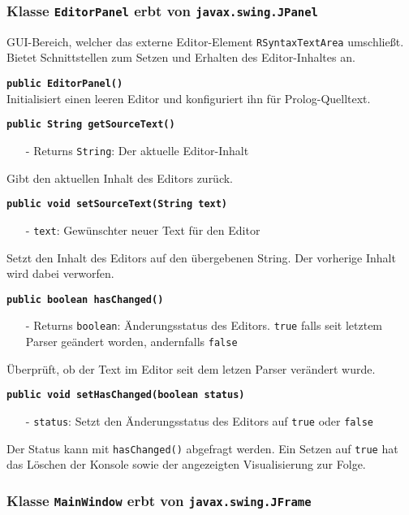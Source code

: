 \documentclass[parskip=full,11pt,twoside]{scrartcl}
\begin{document}
\subsubsection{Klasse \texttt{EditorPanel} erbt von \texttt{javax.swing.JPanel}}

GUI-Bereich, welcher das externe Editor-Element \texttt{RSyntaxTextArea} umschließt. Bietet Schnittstellen zum Setzen und Erhalten des Editor-Inhaltes an.

\textbf{\texttt{public EditorPanel()}}\\
Initialisiert einen leeren Editor und konfiguriert ihn für Prolog-Quelltext.

\textbf{\texttt{public String getSourceText()}}
\begin{itemize}[noitemsep]
	\item[-] Returns \texttt{String}: Der aktuelle Editor-Inhalt
\end{itemize}
Gibt den aktuellen Inhalt des Editors zurück.

\textbf{\texttt{public void setSourceText(String text)}}
\begin{itemize}[noitemsep]
	\item[-] \texttt{text}: Gewünschter neuer Text für den Editor
\end{itemize}
Setzt den Inhalt des Editors auf den übergebenen String. Der vorherige Inhalt wird dabei verworfen.

\textbf{\texttt{public boolean hasChanged()}}
\begin{itemize}[noitemsep]
	\item[-] Returns \texttt{boolean}: Änderungsstatus des Editors. \texttt{true} falls seit letztem Parser geändert worden, andernfalls \texttt{false}
\end{itemize}
Überprüft, ob der Text im Editor seit dem letzen Parser verändert wurde.

\textbf{\texttt{public void setHasChanged(boolean status)}}
\begin{itemize}[noitemsep]
	\item[-] \texttt{status}: Setzt den Änderungsstatus des Editors auf \texttt{true} oder \texttt{false}
\end{itemize}
Der Status kann mit \texttt{hasChanged()} abgefragt werden. Ein Setzen auf \texttt{true} hat das Löschen der Konsole sowie der angezeigten Visualisierung zur Folge.

\subsubsection{Klasse \texttt{MainWindow} erbt von \texttt{javax.swing.JFrame}}
\end{document}
